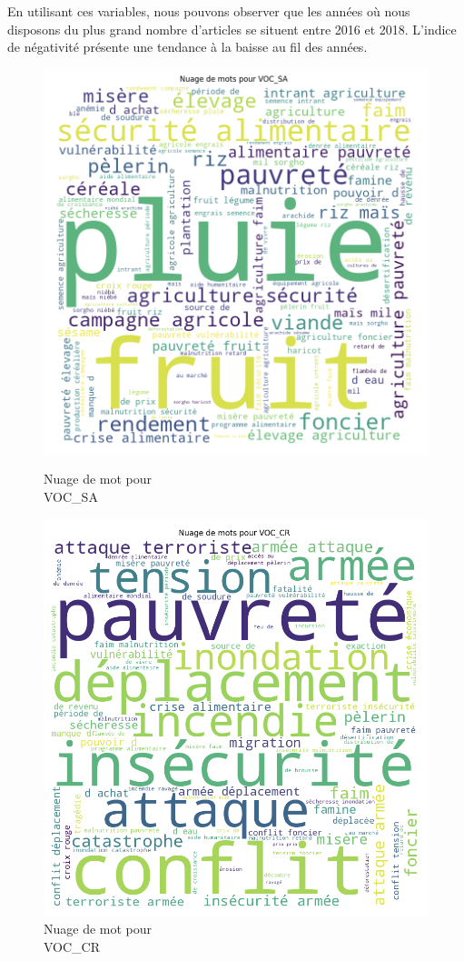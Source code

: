 \documentclass{article}
\begin{document}
En utilisant ces variables, nous pouvons observer que les années où nous disposons du plus grand nombre d'articles se situent entre 2016 et 2018. L'indice de négativité présente une tendance à la baisse au fil des années.

\begin{figure}[h]
    \centering
    \begin{minipage}{.5\textwidth}
        \centering
        \includegraphics[width=0.8\linewidth]{nuage_ca.png}
        \caption{Nuage de mot pour \\VOC_SA}
        \label{fig: Nuage de mot pour VOC_SA}
    \end{minipage}%
    \begin{minipage}{.5\textwidth}
        \centering
        \includegraphics[width=0.8\linewidth]{nuage_cr.png}
        \caption{Nuage de mot pour \\VOC_CR}
        \label{fig: Nuage de mot pour VOC_CR}
    \end{minipage}
\end{figure}
\end{document}
